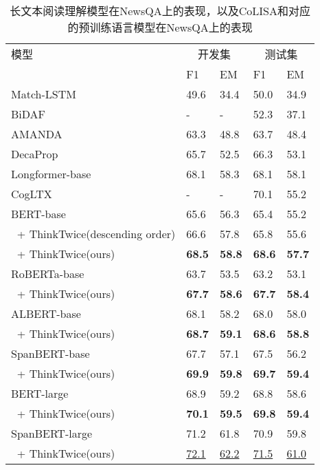 \begin{table}[htbp]
    \centering
    \caption{长文本阅读理解模型在NewsQA上的表现，以及CoLISA和对应的预训练语言模型在NewsQA上的表现}
    \begin{tabular}{lp{24pt}<{\centering}p{24pt}<{\centering}p{24pt}<{\centering}p{24pt}<{\centering}}
         \hline
         {模型} & \multicolumn{2}{c}{开发集} & \multicolumn{2}{c}{测试集} \\
         & {F1} & {EM} & {F1} & {EM} \\
         \hline
         Match-LSTM~\cite{wang2015learning} & 49.6 & 34.4 & 50.0 & 34.9 \\
         BiDAF~\cite{seo2016bidirectional} & - & - & 52.3 & 37.1 \\
         AMANDA~\cite{kundu2018question} & 63.3 & 48.8 & 63.7 & 48.4 \\
         DecaProp~\cite{tay2018densely} & 65.7 & 52.5 & 66.3 & 53.1 \\
         Longformer-base~\cite{beltagy2020longformer} & 68.1 & 58.3 & 68.1 & 58.1 \\
         CogLTX~\cite{ding2020cogltx} & - & - & 70.1 & 55.2 \\
         \hline
         BERT-base~\cite{devlin2018bert} & 65.6 & 56.3 & 65.4 & 55.2 \\
         $\ $ + ThinkTwice(descending order) & 66.6 & 57.8 & 65.8 & 55.6 \\
         $\ $ + ThinkTwice(ours) & {\bfseries 68.5} & {\bfseries 58.8} & {\bfseries 68.6} & {\bfseries 57.7} \\
         \hline
         RoBERTa-base~\cite{liu2019roberta} & 63.7 & 53.5 & 63.2 & 53.1 \\
         $\ $ + ThinkTwice(ours) & {\bfseries 67.7} & {\bfseries 58.6} & {\bfseries 67.7} & {\bfseries 58.4} \\
         \hline
         ALBERT-base~\cite{lan2019albert} & 68.1 & 58.2 & 68.0 & 58.0 \\
         $\ $ + ThinkTwice(ours) & {\bfseries 68.7} & {\bfseries 59.1} & {\bfseries 68.6} & {\bfseries 58.8} \\
         \hline
         SpanBERT-base~\cite{joshi2020spanbert} & 67.7 & 57.1 & 67.5 & 56.2 \\
         $\ $ + ThinkTwice(ours) & {\bfseries 69.9} & {\bfseries 59.8} & {\bfseries 69.7} & {\bfseries 59.4} \\
         \hline
         BERT-large & 68.9 & 59.2 & 68.8 & 58.6 \\
         $\ $ + ThinkTwice(ours) & {\bfseries 70.1} & {\bfseries 59.5} & {\bfseries 69.8} & {\bfseries 59.4} \\
         \hline
         SpanBERT-large & 71.2 & 61.8 & 70.9 & 59.8 \\
         $\ $ + ThinkTwice(ours) & \underline{72.1} & \underline{62.2} & \underline{71.5} & \underline{61.0} \\
         \hline
    \end{tabular}
    \label{tab:3-1}
\end{table}
